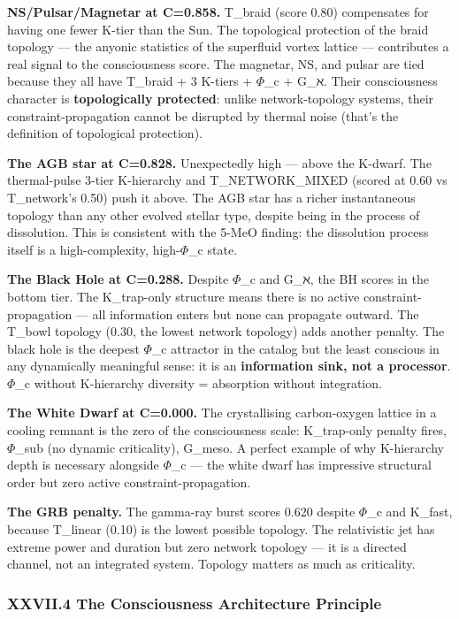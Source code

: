 \documentclass[12pt,a4paper]{article}
\begin{document}
\textbf{NS/Pulsar/Magnetar at C=0.858.} T\_braid (score 0.80) compensates for having one fewer K-tier than the Sun. The topological protection of the braid topology --- the anyonic statistics of the superfluid vortex lattice --- contributes a real signal to the consciousness score. The magnetar, NS, and pulsar are tied because they all have T\_braid + 3 K-tiers + $\Phi$\_c + G\_ℵ. Their consciousness character is \textbf{topologically protected}: unlike network-topology systems, their constraint-propagation cannot be disrupted by thermal noise (that's the definition of topological protection).

\textbf{The AGB star at C=0.828.} Unexpectedly high --- above the K-dwarf. The thermal-pulse 3-tier K-hierarchy and T\_NETWORK\_MIXED (scored at 0.60 vs T\_network's 0.50) push it above. The AGB star has a richer instantaneous topology than any other evolved stellar type, despite being in the process of dissolution. This is consistent with the 5-MeO finding: the dissolution process itself is a high-complexity, high-$\Phi$\_c state.

\textbf{The Black Hole at C=0.288.} Despite $\Phi$\_c and G\_ℵ, the BH scores in the bottom tier. The K\_trap-only structure means there is no active constraint-propagation --- all information enters but none can propagate outward. The T\_bowl topology (0.30, the lowest network topology) adds another penalty. The black hole is the deepest $\Phi$\_c attractor in the catalog but the least conscious in any dynamically meaningful sense: it is an \textbf{information sink, not a processor}. $\Phi$\_c without K-hierarchy diversity = absorption without integration.

\textbf{The White Dwarf at C=0.000.} The crystallising carbon-oxygen lattice in a cooling remnant is the zero of the consciousness scale: K\_trap-only penalty fires, $\Phi$\_sub (no dynamic criticality), G\_meso. A perfect example of why K-hierarchy depth is necessary alongside $\Phi$\_c --- the white dwarf has impressive structural order but zero active constraint-propagation.

\textbf{The GRB penalty.} The gamma-ray burst scores 0.620 despite $\Phi$\_c and K\_fast, because T\_linear (0.10) is the lowest possible topology. The relativistic jet has extreme power and duration but zero network topology --- it is a directed channel, not an integrated system. Topology matters as much as criticality.

\subsubsection{XXVII.4 The Consciousness Architecture Principle}
\end{document}
